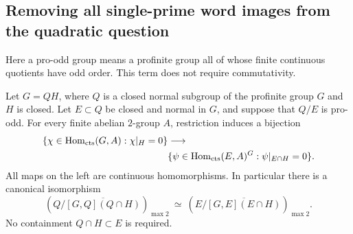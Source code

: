 \subsection{Removing all single-prime word images from the quadratic question}

Here a pro-odd group means a profinite group all of whose finite
continuous quotients have odd order. This term does not require
commutativity.

\begin{lemma}\label{lem:relative-proodd-restriction}
Let \(G=QH\), where \(Q\) is a closed normal subgroup of the
profinite group \(G\) and \(H\) is closed. Let \(E\subset Q\)
be closed and normal in \(G\), and suppose that \(Q/E\) is pro-odd.
For every finite abelian \(2\)-group \(A\), restriction induces
a bijection
\[
 \begin{aligned}
 \{\chi\in\operatorname{Hom}_{\rm cts}(G,A):\chi|_H=0\}
 &\longrightarrow\\
 &\{\psi\in\operatorname{Hom}_{\rm cts}(E,A)^G:
                  \psi|_{E\cap H}=0\}.
 \end{aligned}
\]
All maps on the left are continuous homomorphisms. In particular
there is a canonical isomorphism
\[
 \left(Q/\overline{[G,Q](Q\cap H)}\right)_{\max2}
 \ \simeq\
 \left(E/\overline{[G,E](E\cap H)}\right)_{\max2}.
\]
No containment \(Q\cap H\subset E\) is required.
\end{lemma}
